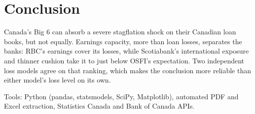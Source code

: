 \documentclass[11pt,letterpaper]{article}
\begin{document}
\section{Conclusion}
Canada's Big 6 can absorb a severe stagflation shock on their Canadian loan books, but not equally. Earnings capacity, more than loan losses, separates the banks: RBC's earnings cover its losses, while Scotiabank's international exposure and thinner cushion take it to just below OSFI's expectation. Two independent loss models agree on that ranking, which makes the conclusion more reliable than either model's loss level on its own.

\vspace{4pt}
{\small\color{gray} Tools: Python (pandas, statsmodels, SciPy, Matplotlib), automated PDF and Excel extraction, Statistics Canada and Bank of Canada APIs.}
\end{document}
